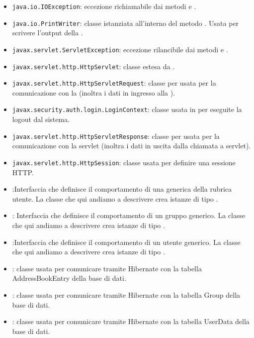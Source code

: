 \begin{itemize}
	\item \texttt{java.io.IOException}: eccezione richiamabile dai metodi  e .
	\item \texttt{java.io.PrintWriter}: classe istanziata all'interno del metodo . Usata per scrivere l'output della .
	\item \texttt{javax.servlet.ServletException}: eccezione rilancibile dai metodi  e .
	\item \texttt{javax.servlet.http.HttpServlet}: classe estesa da .
	\item \texttt{javax.servlet.http.HttpServletRequest}:  classe per usata per la comunicazione con la  (inoltra i dati in ingresso alla ).
	\item \texttt{javax.security.auth.login.LoginContext}: classe usata in  per eseguite la logout dal sistema.
	\item \texttt{javax.servlet.http.HttpServletResponse}: classe per usata per la comunicazione con la servlet (inoltra i dati in uscita dalla chiamata a servlet).
	\item \texttt{javax.servlet.http.HttpSession}: classe usata per definire una sessione HTTP.
	\item {}:Interfaccia che definisce il comportamento di una generica  della rubrica utente. La classe che qui andiamo a descrivere crea istanze di tipo .
	\item {}:
Interfaccia che definisce il comportamento di un gruppo generico. La classe che qui andiamo a descrivere crea istanze di tipo .
	\item {}:Interfaccia che definisce il comportamento di un utente generico. La classe che qui andiamo a descrivere crea istanze di tipo .
	\item {}: classe usata per comunicare tramite Hibernate con la tabella AddressBookEntry della base di dati.
	\item {}: classe usata per comunicare tramite Hibernate con la tabella Group della base di dati.
	\item {}: classe usata per comunicare tramite Hibernate con la tabella UserData della base di dati.
\end{itemize}

